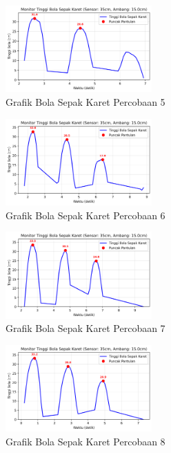 \begin{figure}[htbp]
    \centering
    \includegraphics[width=0.5\textwidth]{chapters/DataPercobaan/Grafik_Bola_Sepak_Karet_5.png}
    \caption{Grafik Bola Sepak Karet Percobaan 5}
\end{figure}
\begin{figure}[htbp]
    \centering
    \includegraphics[width=0.5\textwidth]{chapters/DataPercobaan/Grafik_Bola_Sepak_Karet_6.png}
    \caption{Grafik Bola Sepak Karet Percobaan 6}
\end{figure}
\begin{figure}[htbp]
    \centering
    \includegraphics[width=0.5\textwidth]{chapters/DataPercobaan/Grafik_Bola_Sepak_Karet_7.png}
    \caption{Grafik Bola Sepak Karet Percobaan 7}
\end{figure}
\begin{figure}[htbp]
    \centering
    \includegraphics[width=0.5\textwidth]{chapters/DataPercobaan/Grafik_Bola_Sepak_Karet_8.png}
    \caption{Grafik Bola Sepak Karet Percobaan 8}
\end{figure}
